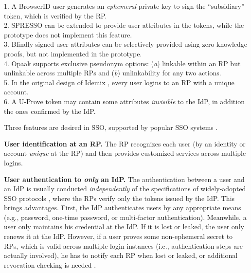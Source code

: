 \begin{table}[tb]
\flushleft
{\footnotesize
1. A BrowserID user generates an \emph{ephemeral} private key to sign the ``subsidiary'' token,
 which is verified by the RP.\\
2. SPRESSO can be extended to provide user attributes in the tokens, while the prototype does not implement this feature.\\
3. Blindly-signed user attributes can be selectively provided using zero-knowledge proofs,
    but not implemented in the prototype.\\
4. Opaak supports exclusive pseudonym options: (\emph{a}) linkable within an RP but unlinkable across multiple RPs and (\emph{b}) unlinkability for any two actions.\\
5. In the original design of Idemix \cite{idemix}, every user logins to an RP with a unique account.\\
6. A U-Prove token may contain some attributes \emph{invisible} to the IdP, in addition the ones confirmed by the IdP.}
\end{table}

Three features are desired in SSO, supported by popular SSO systems \cite{NIST2017draft,OpenIDConnect,rfc6749,SAML,SAMLIdentifier}.

\noindent \textbf{User identification at an RP.}
The RP recognizes each user (by an identity or account \emph{unique}  at the RP) and then provides customized services across multiple logins.


\noindent\textbf{User authentication to {\em only} an IdP.}
The authentication between a user and an IdP is usually conducted \emph{independently}
    of the specifications of widely-adopted SSO protocols \cite{OpenIDConnect,rfc6749,SAML},
where the RPs verify only the tokens issued by the IdP.
This brings advantages. First, the IdP authenticates users by any appropriate means (e.g., password,
one-time password, or multi-factor authentication).
Meanwhile, a user only maintains his credential at the IdP. If it is lost or leaked, the user only renews it at the IdP. However, if a user proves some non-ephemeral secret to RPs, which is valid across multiple login instances (i.e., authentication steps are actually involved),
 he has to notify each RP when lost or leaked, %
  or additional revocation checking is needed \cite{ELPASSO,UnlimitID}.

